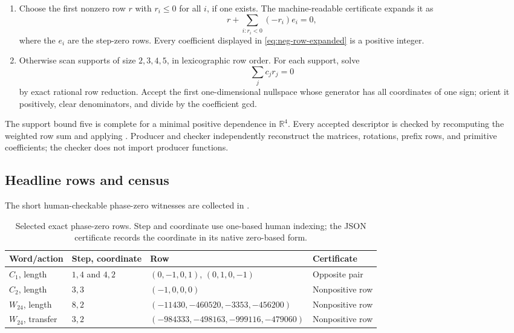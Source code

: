 \begin{enumerate}[label=\arabic*.,leftmargin=2em]
\item Choose the first nonzero row $r$ with $r_i\leq0$ for all $i$, if one
  exists.  The machine-readable certificate expands it as
  \begin{equation}
    r+\sum_{i:r_i<0}(-r_i)e_i=0,
    \label{eq:neg-row-expanded}
  \end{equation}
  where the $e_i$ are the step-zero rows.  Every coefficient displayed in
  \eqref{eq:neg-row-expanded} is a positive integer.
\item Otherwise scan supports of size $2,3,4,5$, in lexicographic row order.
  For each support, solve
  \begin{equation}
    \sum_jc_jr_j=0
    \label{eq:null-relation}
  \end{equation}
  by exact rational row reduction.  Accept the first one-dimensional
  nullspace whose generator has all coordinates of one sign; orient it
  positively, clear denominators, and divide by the coefficient gcd.
\end{enumerate}

The support bound five is complete for a minimal positive dependence in
$\mathbb R^4$.  Every accepted descriptor is checked by recomputing the
weighted row sum and applying .  Producer and
checker independently reconstruct the matrices, rotations, prefix rows, and
primitive coefficients; the checker does not import producer functions.

\subsection{Headline rows and census}

The short human-checkable phase-zero witnesses are collected in
.

\begin{table}[ht]
\centering
\small
\begin{tabularx}{\textwidth}{@{}l l l X@{}}
\toprule
Word/action & Step, coordinate & Row & Certificate \\
\midrule
$C_1$, length & $1,4$ and $4,2$ &
$(0,-1,0,1)$, $(0,1,0,-1)$ & Opposite pair \\
$C_2$, length & $3,3$ &
$(-1,0,0,0)$ & Nonpositive row \\
$W_{24}$, length & $8,2$ &
$(-11430,-460520,-3353,-456200)$ & Nonpositive row \\
$W_{24}$, transfer & $3,2$ &
$(-984333,-498163,-999116,-479060)$ & Nonpositive row \\
\bottomrule
\end{tabularx}
\caption{Selected exact phase-zero rows.  Step and coordinate use one-based
human indexing; the JSON certificate records the coordinate in its native
zero-based form.}
\label{tab:headline-rows}
\end{table}

